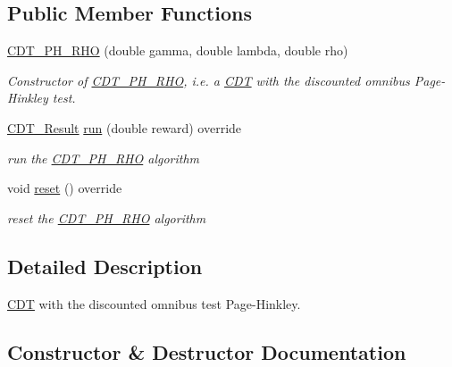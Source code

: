 \subsection*{Public Member Functions}
\begin{DoxyCompactItemize}
\item 
\mbox{\hyperlink{class_c_d_t___p_h___r_h_o_ac9afe83ec08447b0d88c4e963fe95295}{C\+D\+T\+\_\+\+P\+H\+\_\+\+R\+HO}} (double gamma, double lambda, double rho)
\begin{DoxyCompactList}\small\item\em Constructor of \mbox{\hyperlink{class_c_d_t___p_h___r_h_o}{C\+D\+T\+\_\+\+P\+H\+\_\+\+R\+HO}}, i.\+e. a \mbox{\hyperlink{class_c_d_t}{C\+DT}} with the discounted omnibus Page-\/\+Hinkley test. \end{DoxyCompactList}\item 
\mbox{\hyperlink{class_c_d_t___result}{C\+D\+T\+\_\+\+Result}} \mbox{\hyperlink{class_c_d_t___p_h___r_h_o_a8c66d0d856204b5368e5b6cba989b0d7}{run}} (double reward) override
\begin{DoxyCompactList}\small\item\em run the \mbox{\hyperlink{class_c_d_t___p_h___r_h_o}{C\+D\+T\+\_\+\+P\+H\+\_\+\+R\+HO}} algorithm \end{DoxyCompactList}\item 
void \mbox{\hyperlink{class_c_d_t___p_h___r_h_o_acd4e4d53cbda5713ac60f07f002ec1c2}{reset}} () override
\begin{DoxyCompactList}\small\item\em reset the \mbox{\hyperlink{class_c_d_t___p_h___r_h_o}{C\+D\+T\+\_\+\+P\+H\+\_\+\+R\+HO}} algorithm \end{DoxyCompactList}\end{DoxyCompactItemize}


\subsection{Detailed Description}
\mbox{\hyperlink{class_c_d_t}{C\+DT}} with the discounted omnibus test Page-\/\+Hinkley. 

\subsection{Constructor \& Destructor Documentation}
\mbox{\label{class_c_d_t___p_h___r_h_o_ac9afe83ec08447b0d88c4e963fe95295}} 
